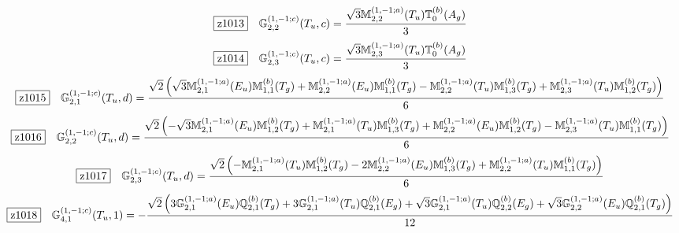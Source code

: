 \documentclass[fleqn,10pt,landscape]{jsarticle}
\begin{document}
\begin{dmath*}
\hspace*{3mm}\fbox{z1013}\quad \mathbb{G}_{2,2}^{(1,-1;c)}(T_{u},c)=\frac{\sqrt{3} \mathbb{M}_{2,2}^{(1,-1;a)}(T_{u}) \mathbb{T}_{0}^{(b)}(A_{g})}{3}
\end{dmath*}
\begin{dmath*}
\hspace*{3mm}\fbox{z1014}\quad \mathbb{G}_{2,3}^{(1,-1;c)}(T_{u},c)=\frac{\sqrt{3} \mathbb{M}_{2,3}^{(1,-1;a)}(T_{u}) \mathbb{T}_{0}^{(b)}(A_{g})}{3}
\end{dmath*}
\begin{dmath*}
\hspace*{3mm}\fbox{z1015}\quad \mathbb{G}_{2,1}^{(1,-1;c)}(T_{u},d)=\frac{\sqrt{2} \left(\sqrt{3} \mathbb{M}_{2,1}^{(1,-1;a)}(E_{u}) \mathbb{M}_{1,1}^{(b)}(T_{g}) + \mathbb{M}_{2,2}^{(1,-1;a)}(E_{u}) \mathbb{M}_{1,1}^{(b)}(T_{g}) - \mathbb{M}_{2,2}^{(1,-1;a)}(T_{u}) \mathbb{M}_{1,3}^{(b)}(T_{g}) + \mathbb{M}_{2,3}^{(1,-1;a)}(T_{u}) \mathbb{M}_{1,2}^{(b)}(T_{g})\right)}{6}
\end{dmath*}
\begin{dmath*}
\hspace*{3mm}\fbox{z1016}\quad \mathbb{G}_{2,2}^{(1,-1;c)}(T_{u},d)=\frac{\sqrt{2} \left(- \sqrt{3} \mathbb{M}_{2,1}^{(1,-1;a)}(E_{u}) \mathbb{M}_{1,2}^{(b)}(T_{g}) + \mathbb{M}_{2,1}^{(1,-1;a)}(T_{u}) \mathbb{M}_{1,3}^{(b)}(T_{g}) + \mathbb{M}_{2,2}^{(1,-1;a)}(E_{u}) \mathbb{M}_{1,2}^{(b)}(T_{g}) - \mathbb{M}_{2,3}^{(1,-1;a)}(T_{u}) \mathbb{M}_{1,1}^{(b)}(T_{g})\right)}{6}
\end{dmath*}
\begin{dmath*}
\hspace*{3mm}\fbox{z1017}\quad \mathbb{G}_{2,3}^{(1,-1;c)}(T_{u},d)=\frac{\sqrt{2} \left(- \mathbb{M}_{2,1}^{(1,-1;a)}(T_{u}) \mathbb{M}_{1,2}^{(b)}(T_{g}) - 2 \mathbb{M}_{2,2}^{(1,-1;a)}(E_{u}) \mathbb{M}_{1,3}^{(b)}(T_{g}) + \mathbb{M}_{2,2}^{(1,-1;a)}(T_{u}) \mathbb{M}_{1,1}^{(b)}(T_{g})\right)}{6}
\end{dmath*}
\begin{dmath*}
\hspace*{3mm}\fbox{z1018}\quad \mathbb{G}_{4,1}^{(1,-1;c)}(T_{u},1)=- \frac{\sqrt{2} \left(3 \mathbb{G}_{2,1}^{(1,-1;a)}(E_{u}) \mathbb{Q}_{2,1}^{(b)}(T_{g}) + 3 \mathbb{G}_{2,1}^{(1,-1;a)}(T_{u}) \mathbb{Q}_{2,1}^{(b)}(E_{g}) + \sqrt{3} \mathbb{G}_{2,1}^{(1,-1;a)}(T_{u}) \mathbb{Q}_{2,2}^{(b)}(E_{g}) + \sqrt{3} \mathbb{G}_{2,2}^{(1,-1;a)}(E_{u}) \mathbb{Q}_{2,1}^{(b)}(T_{g})\right)}{12}
\end{dmath*}
\end{document}

